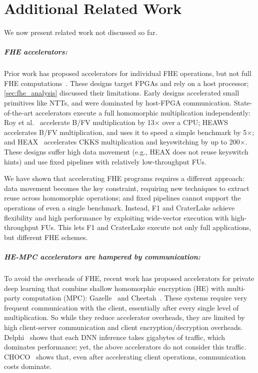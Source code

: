 \chapter{Additional Related Work}\label{sec:related}

We now present related work not discussed so far.

\paragraph{FHE accelerators:}
Prior work has proposed accelerators for individual FHE operations, but not
full FHE
computations~\cite{cousins:hpec12:sipher-fpga,cousins:hpec14:fpga-he,cousins:tetc17:fpga-he,doroz:tc15:accelerating-fhe,roy:hpca19:fpga-he,mert:tvlsi20:bfv-accel,migliore:tecs17:he-karatsuba,riazi:asplos20:heax,turan:tc20:heaws}.
These designs target FPGAs and rely on a host processor;
\autoref{sec:fhe_analysis} discussed their limitations. Early designs
accelerated small primitives like NTTs, and were dominated by host-FPGA
communication. State-of-the-art accelerators execute a full homomorphic
multiplication independently: Roy et al.~\cite{roy:hpca19:fpga-he} accelerate
B/FV multiplication by 13$\times$ over a CPU; HEAWS~\cite{turan:tc20:heaws}
accelerates B/FV multiplication, and uses it to speed a simple benchmark by
5$\times$; and HEAX~\cite{riazi:asplos20:heax} accelerates CKKS multiplication
and keyswitching by up to 200$\times$. These designs suffer high data movement
(e.g., HEAX does not reuse keyswitch hints) and use fixed pipelines with
relatively low-throughput FUs.

We have shown that accelerating FHE programs requires a different approach:
data movement becomes the key constraint, requiring new techniques to extract
reuse {across} homomorphic operations; and fixed pipelines cannot support the
operations of even a single benchmark. Instead, F1 and CraterLake achieve
flexibility and high performance by exploiting wide-vector execution with
high-throughput FUs. This lets F1 and CraterLake execute not only full
applications, but different FHE schemes.

\paragraph{HE-MPC accelerators are hampered by communication:}
To avoid the overheads of FHE, recent work has proposed accelerators for
private deep learning that combine shallow homomorphic encryption (HE) with
multi-party computation (MPC): Gazelle~\cite{juvekar2018gazelle} and
Cheetah~\cite{reagen:hpca21:cheetah}. These systems require very frequent
communication with the client, essentially after every single level of
multiplication. So while they reduce accelerator overheads, they are limited by
high client-server communication and client encryption/decryption overheads.
Delphi~\cite{mishra2020delphi} shows that each DNN inference takes gigabytes of
traffic, which dominates performance; yet, the above accelerators do not
consider this traffic. CHOCO~\cite{vanderhagen:arxiv21:choco} shows that, even
after accelerating client operations, communication costs dominate.

